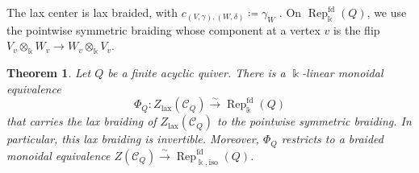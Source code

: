 \documentclass{amsart}
\newtheorem{theorem}{Theorem}[section]
\theoremstyle{definition}
\theoremstyle{remark}
\numberwithin{equation}{section}
\begin{document}
The lax center is lax braided, with
$c_{(V,\gamma),(W,\delta)}\coloneqq\gamma_W$
\cite{DPS2007}.
On $\operatorname{Rep}^{\mathrm{fd}}_{\Bbbk}(Q)$, we use the pointwise
symmetric braiding whose component at a vertex $v$ is the flip
$V_v\otimes_{\Bbbk} W_v\to W_v\otimes_{\Bbbk} V_v$.

\begin{theorem}\label{xxthm3.2}
Let $Q$ be a finite acyclic quiver.
There is a $\Bbbk$-linear monoidal equivalence
\[
\Phi_Q\colon
Z_{\mathrm{lax}}(\mathcal C_Q)
\xrightarrow{\sim}
\operatorname{Rep}^{\mathrm{fd}}_{\Bbbk}(Q)
\]
that carries the lax braiding of $Z_{\mathrm{lax}}(\mathcal C_Q)$ to the
pointwise symmetric braiding. In particular, this lax braiding is
invertible. Moreover, $\Phi_Q$ restricts to a braided monoidal equivalence
$Z(\mathcal C_Q)\xrightarrow{\sim}
\operatorname{Rep}^{\mathrm{fd}}_{\Bbbk,\mathrm{iso}}(Q)$.
\end{theorem}
\end{document}
